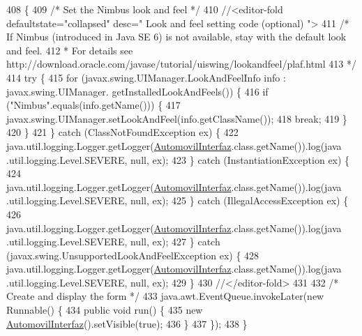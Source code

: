 \begin{DoxyCode}
408                                            \{
409         \textcolor{comment}{/* Set the Nimbus look and feel */}
410         \textcolor{comment}{//<editor-fold defaultstate="collapsed" desc=" Look and feel setting code (optional) ">}
411         \textcolor{comment}{/* If Nimbus (introduced in Java SE 6) is not available, stay with the default look and feel.}
412 \textcolor{comment}{         * For details see http://download.oracle.com/javase/tutorial/uiswing/lookandfeel/plaf.html }
413 \textcolor{comment}{         */}
414         \textcolor{keywordflow}{try} \{
415             \textcolor{keywordflow}{for} (javax.swing.UIManager.LookAndFeelInfo info : javax.swing.UIManager.
      getInstalledLookAndFeels()) \{
416                 \textcolor{keywordflow}{if} (\textcolor{stringliteral}{"Nimbus"}.equals(info.getName())) \{
417                     javax.swing.UIManager.setLookAndFeel(info.getClassName());
418                     \textcolor{keywordflow}{break};
419                 \}
420             \}
421         \} \textcolor{keywordflow}{catch} (ClassNotFoundException ex) \{
422             java.util.logging.Logger.getLogger(\mbox{\hyperlink{classejercicio2_1_1_automovil_interfaz_a0ebeee030ec43693c371da3b68222644}{AutomovilInterfaz}}.class.getName()).log(java
      .util.logging.Level.SEVERE, null, ex);
423         \} \textcolor{keywordflow}{catch} (InstantiationException ex) \{
424             java.util.logging.Logger.getLogger(\mbox{\hyperlink{classejercicio2_1_1_automovil_interfaz_a0ebeee030ec43693c371da3b68222644}{AutomovilInterfaz}}.class.getName()).log(java
      .util.logging.Level.SEVERE, null, ex);
425         \} \textcolor{keywordflow}{catch} (IllegalAccessException ex) \{
426             java.util.logging.Logger.getLogger(\mbox{\hyperlink{classejercicio2_1_1_automovil_interfaz_a0ebeee030ec43693c371da3b68222644}{AutomovilInterfaz}}.class.getName()).log(java
      .util.logging.Level.SEVERE, null, ex);
427         \} \textcolor{keywordflow}{catch} (javax.swing.UnsupportedLookAndFeelException ex) \{
428             java.util.logging.Logger.getLogger(\mbox{\hyperlink{classejercicio2_1_1_automovil_interfaz_a0ebeee030ec43693c371da3b68222644}{AutomovilInterfaz}}.class.getName()).log(java
      .util.logging.Level.SEVERE, null, ex);
429         \}
430         \textcolor{comment}{//</editor-fold>}
431 
432         \textcolor{comment}{/* Create and display the form */}
433         java.awt.EventQueue.invokeLater(\textcolor{keyword}{new} Runnable() \{
434             \textcolor{keyword}{public} \textcolor{keywordtype}{void} run() \{
435                 \textcolor{keyword}{new} \mbox{\hyperlink{classejercicio2_1_1_automovil_interfaz_a0ebeee030ec43693c371da3b68222644}{AutomovilInterfaz}}().setVisible(\textcolor{keyword}{true});
436             \}
437         \});
438     \}
\end{DoxyCode}


